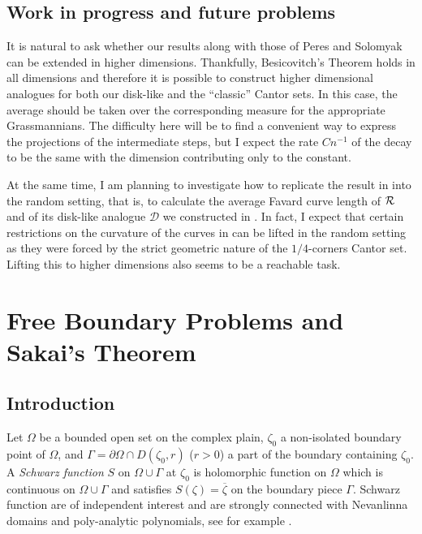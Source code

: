 \documentclass[11pt]{amsart} %
\theoremstyle{remark} %
\theoremstyle{definition} %
\numberwithin{equation}{section} %
\def \cD{{\mathcal{D}}}	\def \cJ{{\mathcal{J}}}	\def \cP{{\mathcal{P}}}	\def \cV{{\mathcal{V}}}
\newcommand{\bd}{\partial} %
\newcommand{\0}[1]{\overline{#1}} %
\newcommand{\1}[1]{\tilde{#1}} %
\newcommand{\2}[1]{{}_{|#1}} %
\begin{document}
\subsection*{Work in progress and future problems}	%
It is natural to ask whether our results along with those of Peres and Solomyak can be extended in higher dimensions. Thankfully, Besicovitch's Theorem \cite{Mat1975} holds in all dimensions and therefore it is possible to construct higher dimensional analogues for both our disk-like and the ``classic'' Cantor sets. In this case, the average should be taken over the corresponding measure for the appropriate Grassmannians. The difficulty here will be to find a convenient way to express the projections of the intermediate steps, but I expect the rate $Cn^{-1}$ of the decay to be the same with the dimension contributing only to the constant.

\smallskip

At the same time, I am planning to investigate how to replicate the result in \cite{ClaDavTay2022} into the random setting, that is, to calculate the average Favard curve length of ${\mathcal{R}}$ and of its disk-like analogue $\cD$ we constructed in \cite{VarVol2022ep}. In fact, I expect that certain restrictions on the curvature of the curves in \cite{ClaDavTay2022} can be lifted in the random setting as they were forced by the strict geometric nature of the $1/4$-corners Cantor set. Lifting this to higher dimensions also seems to be a reachable task.


\section{Free Boundary Problems and Sakai's Theorem}	\label{sec:Sakai}

\subsection*{Introduction}	%

Let $Ω$ be a bounded open set on the complex plain, $ζ_0$ a non-isolated boundary point of $Ω$, and $Γ=\bd Ω\cap D(ζ_0,r)$ ($r>0$) a part of the boundary containing $ζ_0$. A \emph{Schwarz function} $S$ on $Ω\cup Γ$ at $ζ_0$ is holomorphic function on $Ω$ which is continuous on $Ω\cup Γ$ and satisfies $S(ζ)=\0{ζ}$ on the boundary piece $Γ$. Schwarz function are of independent interest and are strongly connected with Nevanlinna domains and poly-analytic polynomials, see for example \cite{CarParFed2002,Fed2006}.
\end{document}
